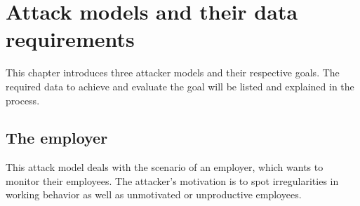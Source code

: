\chapter{Attack models and their data requirements}\label{data-aggregation}

This chapter introduces three attacker models and their respective goals.
The required data to achieve and evaluate the goal will be listed and explained in the process.


\section{The employer}

This attack model deals with the scenario of an employer, which wants to monitor their employees.
The attacker's motivation is to spot irregularities in working behavior as well as unmotivated or unproductive employees.


